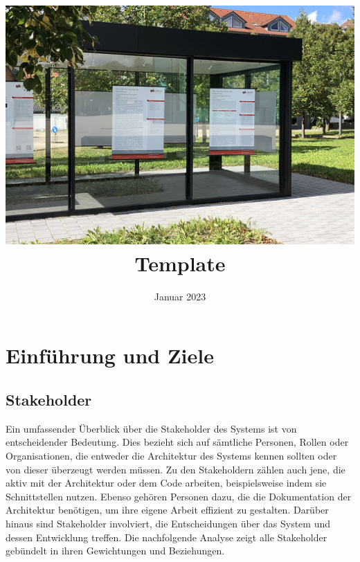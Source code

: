 \documentclass[
]{article}
\title{\includegraphics{header.jpg} Template}
\author{}
\date{Januar 2023}
\begin{document}
\maketitle



\hypertarget{section-introduction-and-goals}{%
\section{Einführung und Ziele}\label{section-introduction-and-goals}}

\hypertarget{_stakeholder}{%
\subsection{Stakeholder}\label{_stakeholder}}
Ein umfassender Überblick über die Stakeholder des Systems ist von entscheidender Bedeutung. Dies bezieht sich auf sämtliche Personen, Rollen oder Organisationen, die entweder die Architektur des Systems kennen sollten oder von dieser überzeugt werden müssen. Zu den Stakeholdern zählen auch jene, die aktiv mit der Architektur oder dem Code arbeiten, beispielsweise indem sie Schnittstellen nutzen. Ebenso gehören Personen dazu, die die Dokumentation der Architektur benötigen, um ihre eigene Arbeit effizient zu gestalten. Darüber hinaus sind Stakeholder involviert, die Entscheidungen über das System und dessen Entwicklung treffen.
Die nachfolgende Analyse zeigt alle Stakeholder gebündelt in ihren Gewichtungen und Beziehungen.  
\end{document}
